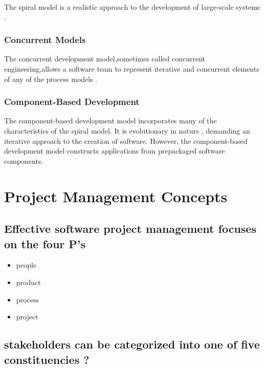 \documentclass[12pt]{article}
\begin{document}
The spiral model is a realistic approach to the development of large-scale systems .



\subsubsection{Concurrent Models}

The concurrent development model,sometimes called concurrent engineering,allows
a software team to represent iterative and concurrent elements of any of the process
models .





\subsubsection{Component-Based Development}

The component-based development model incorporates many of the characteristics of the
spiral model. It is evolutionary in nature , demanding an iterative approach to
the creation of software. However, the component-based development model constructs applications from prepackaged software components.



\section{Project Management Concepts}



\subsection{Effective software project management focuses on the four P’s}

\begin{itemize}
	\item people
	\item product
	\item process
	\item project
\end{itemize}




\subsection{stakeholders can be categorized into one of five constituencies ? }
\end{document}
